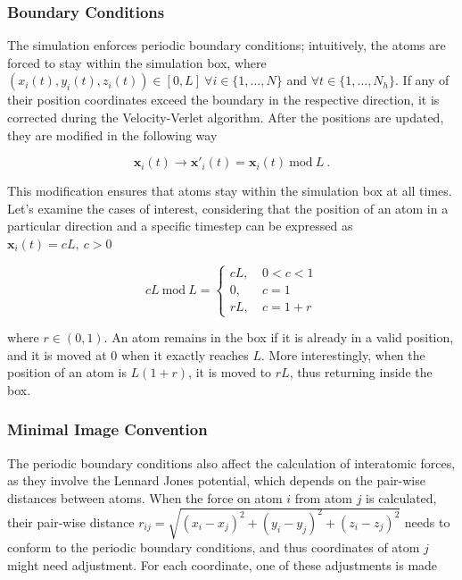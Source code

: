 \documentclass[twocolumn,10pt]{article}
\begin{document}
\subsubsection{Boundary Conditions}

The simulation enforces periodic boundary conditions; intuitively, the atoms are forced to stay within the simulation box, where $(x_i(t),y_i(t),z_i(t)) \in [0,L] \ \forall i \in \{1,\dots,N \}$ and $\forall t \in \{1,\dots,N_h\}$. If any of their position coordinates exceed the boundary in the respective direction, it is corrected during the Velocity-Verlet algorithm. After the positions are updated, they are modified in the following way

\begin{equation}
    \mathbf{x}_i(t) \to \mathbf{x}'_i(t) = \mathbf{x}_i(t) \ \text{mod} \ L \ .
\end{equation}

\noindent This modification ensures that atoms stay within the simulation box at all times. Let's examine the cases of interest, considering that the position of an atom in a particular direction and a specific timestep can be expressed as $\mathbf{x}_i(t) = cL, \ c>0$

\begin{equation}
    cL \ \text{mod} \ L =
    \begin{cases}
        cL, \ &0<c<1 \\
        0, \  &c=1\\
        rL, \ &c = 1 + r
    \end{cases}
\end{equation}

\noindent where $r\in(0,1)$. An atom remains in the box if it is already in a valid position, and it is moved at 0 when it exactly reaches $L$. More interestingly, when the position of an atom is $L(1 + r)$, it is moved to $rL$, thus returning inside the box.\\

\subsubsection{Minimal Image Convention}

The periodic boundary conditions also affect the calculation of interatomic forces, as they involve the Lennard Jones potential, which depends on the pair-wise distances between atoms. When the force on atom $i$ from atom $j$ is calculated, their pair-wise distance $r_{ij} = \sqrt{(x_i-x_j)^2+(y_i-y_j)^2+(z_i-z_j)^2}$ needs to conform to the periodic boundary conditions, and thus coordinates of atom $j$ might need adjustment. For each coordinate, one of these adjustments is made
\end{document}
